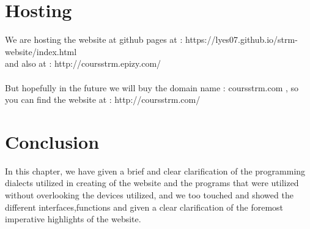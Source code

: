 \section{Hosting}
We are hosting the website at github pages at : https://lyes07.github.io/strm-website/index.html\\
and also at : http://coursstrm.epizy.com/
\\\\But hopefully in the future we will buy the domain name : coursstrm.com , so you can find the website at : http://coursstrm.com/
\section{Conclusion}
In this chapter, we have given a brief and clear clarification of the programming dialects utilized in creating of the website and the programs that were utilized without overlooking the devices utilized, and we too touched and showed the different interfaces,functions and given a clear clarification of the foremost imperative highlights of the website.\\